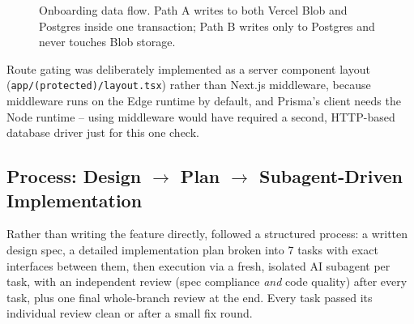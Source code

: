 \documentclass[11pt,a4paper]{article}
\begin{document}
\begin{figure}[h]
\centering
{}
\caption{Onboarding data flow. Path A writes to both Vercel Blob
  and Postgres inside one transaction; Path B writes only to
  Postgres and never touches Blob storage.}
\label{fig:onboarding-flow}
\end{figure}

Route gating was deliberately implemented as a server component
layout (\texttt{app/(protected)/layout.tsx}) rather than
Next.js middleware, because middleware runs on the Edge runtime
by default, and Prisma's client needs the Node runtime -- using
middleware would have required a second, HTTP-based database
driver just for this one check.

\subsection{Process: Design $\to$ Plan $\to$ Subagent-Driven
  Implementation}
Rather than writing the feature directly, followed a structured
process: a written design spec, a detailed implementation plan
broken into 7 tasks with exact interfaces between them, then
execution via a fresh, isolated AI subagent per task, with an
independent review (spec compliance \emph{and} code quality)
after every task, plus one final whole-branch review at the end.
Every task passed its individual review clean or after a small
fix round.
\end{document}
